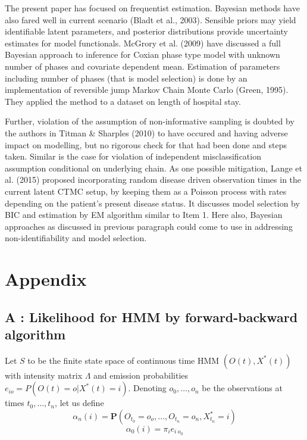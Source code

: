 \documentclass{uwstat572}
\begin{document}
The present paper has focused on frequentist estimation. Bayesian methods have also fared well in current scenario (Bladt et al., 2003). Sensible priors may yield identifiable latent parameters, and posterior distributions provide uncertainty estimates for model functionals. McGrory et al. (2009) have discussed a full Bayesian approach to inference for Coxian phase type model with unknown number of phases and covariate dependent mean. Estimation of parameters including number of phases (that is model selection) is done by an implementation of reversible jump Markov Chain Monte Carlo (Green, 1995). They applied the method to a dataset on length of hospital stay.

Further, violation of the assumption of non-informative sampling is doubted by the authors in Titman \& Sharples (2010) to have occured and having adverse impact on modelling, but no rigorous check for that had been done and steps taken. Similar is the case for violation of independent misclassification assumption conditional on underlying chain. As one possible mitigation, Lange et al. (2015) proposed incorporating random disease driven observation times in the current latent CTMC setup, by keeping them as a Poisson process with rates depending on the patient's present disease status. It discusses model selection by BIC and estimation by EM algorithm similar to Item 1. Here also, Bayesian approaches as discussed in previous paragraph could come to use in addressing non-identifiability and model selection.




\section*{Appendix}
\subsection*{A : Likelihood for HMM by forward-backward algorithm}\label{Appendix : A}
Let $S$ to be the finite state space of continuous time HMM $(O(t),X^*(t))$ with intensity matrix $\Lambda$ and emission probabilities $e_{i o}=P(O(t)=o|X^*(t)=i)$. Denoting $o_0,\ldots, o_n$ be the observations at times $t_0,\ldots,t_n$, let us define
\[
\alpha_n(i) = \mathbf{P}(O_{t_0}=o_o,\ldots, O_{t_n}=o_n,X^*_{t_n}=i)
\]
\[
\alpha_0(i)=\pi_i e_{i~ o_0}
\]
\end{document}
